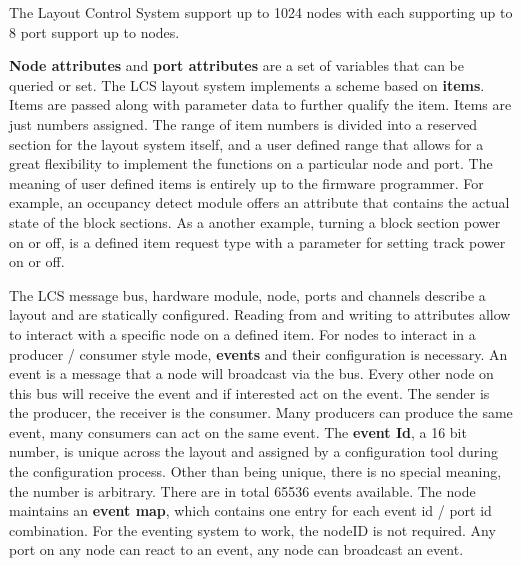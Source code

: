 The Layout Control System support up to 1024 nodes with each supporting up to 8 port support up to nodes. 


{\bf Node attributes} and {\bf port attributes} are a set of variables that can be queried or set. The LCS layout system implements a scheme based on \textbf{items}. Items are passed along with parameter data to further qualify the item. Items are just numbers assigned. The range of item numbers is divided into a reserved section for the layout system itself, and a user defined range that allows for a great flexibility to implement the functions on a particular node and port. The meaning of user defined items is entirely up to the firmware programmer. For example, an occupancy detect module offers an attribute that contains the actual state of the block sections. As a another example, turning a block section power on or off, is a defined item request type with a parameter for setting track power on or off.


The LCS message bus, hardware module, node, ports and channels describe a layout and are statically configured. Reading from and writing to attributes allow to interact with a specific node on a defined item. For nodes to interact in a producer / consumer style mode, {\bf events} and their configuration is necessary. An event is a message that a node will broadcast via the bus. Every other node on this bus will receive the event and if interested act on the event. The sender is the producer, the receiver is the consumer. Many producers can produce the same event, many consumers can act on the same event. The {\bf event Id}, a 16 bit number, is unique across the layout and assigned by a configuration tool during the configuration process. Other than being unique, there is no special meaning, the number is arbitrary. There are in total 65536 events available. The node maintains an {\bf event map}, which contains one entry for each event id / port id combination. For the eventing system to work, the nodeID is not required. Any port on any node can react to an event, any node can broadcast an event.

\begin{center}
\end{center}


